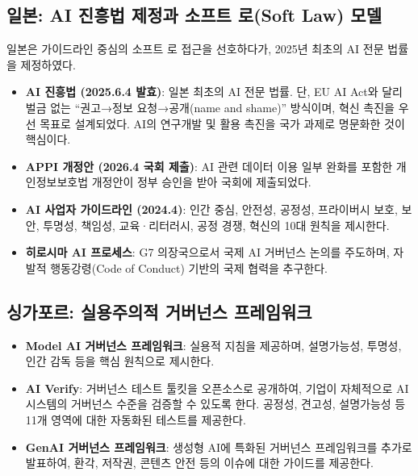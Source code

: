 \subsection{일본: AI 진흥법 제정과 소프트 로(Soft Law) 모델}
일본은 가이드라인 중심의 소프트 로 접근을 선호하다가, 2025년 최초의 AI 전문 법률을 제정하였다.\cite{jobin2019global}
\begin{itemize}
 \item \textbf{AI 진흥법 (2025.6.4 발효)}: 일본 최초의 AI 전문 법률. 단, EU AI Act와 달리 벌금 없는 ``권고→정보 요청→공개(name and shame)'' 방식이며, 혁신 촉진을 우선 목표로 설계되었다. AI의 연구개발 및 활용 촉진을 국가 과제로 명문화한 것이 핵심이다.
 \item \textbf{APPI 개정안 (2026.4 국회 제출)}: AI 관련 데이터 이용 일부 완화를 포함한 개인정보보호법 개정안이 정부 승인을 받아 국회에 제출되었다.
 \item \textbf{AI 사업자 가이드라인 (2024.4)}: 인간 중심, 안전성, 공정성, 프라이버시 보호, 보안, 투명성, 책임성, 교육·리터러시, 공정 경쟁, 혁신의 10대 원칙을 제시한다.
 \item \textbf{히로시마 AI 프로세스}: G7 의장국으로서 국제 AI 거버넌스 논의를 주도하며, 자발적 행동강령(Code of Conduct) 기반의 국제 협력을 추구한다.
\end{itemize}

\subsection{싱가포르: 실용주의적 거버넌스 프레임워크}
\begin{itemize}
 \item \textbf{Model AI 거버넌스 프레임워크}: 실용적 지침을 제공하며, 설명가능성, 투명성, 인간 감독 등을 핵심 원칙으로 제시한다.
 \item \textbf{AI Verify}: 거버넌스 테스트 툴킷을 오픈소스로 공개하여\cite{singapore2020model}, 기업이 자체적으로 AI 시스템의 거버넌스 수준을 검증할 수 있도록 한다. 공정성, 견고성, 설명가능성 등 11개 영역에 대한 자동화된 테스트를 제공한다.
 \item \textbf{GenAI 거버넌스 프레임워크}: 생성형 AI에 특화된 거버넌스 프레임워크를 추가로 발표하여, 환각, 저작권, 콘텐츠 안전 등의 이슈에 대한 가이드를 제공한다.
\end{itemize}

